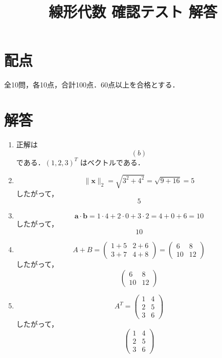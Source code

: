 \documentclass[uplatex,a4paper,12pt]{jsarticle}
\begin{document}
\title{線形代数 確認テスト 解答}
\author{}
\date{}
\maketitle

\section*{配点}
全10問，各10点，合計100点．60点以上を合格とする．

\section*{解答}

\begin{enumerate}

\item
正解は
\[
\boxed{(b)}
\]
である．$(1,2,3)^T$ はベクトルである．

\item
\[
\|\mathbf{x}\|_2
=
\sqrt{3^2+4^2}
=
\sqrt{9+16}
=
5
\]
したがって，
\[
\boxed{5}
\]

\item
\[
\mathbf{a}\cdot\mathbf{b}
=
1\cdot4+2\cdot0+3\cdot2
=
4+0+6
=
10
\]
したがって，
\[
\boxed{10}
\]

\item
\[
A+B=
\begin{pmatrix}
1+5 & 2+6\\
3+7 & 4+8
\end{pmatrix}
=
\begin{pmatrix}
6&8\\
10&12
\end{pmatrix}
\]
したがって，
\[
\boxed{
\begin{pmatrix}
6&8\\
10&12
\end{pmatrix}
}
\]

\item
\[
A^T=
\begin{pmatrix}
1&4\\
2&5\\
3&6
\end{pmatrix}
\]
したがって，
\[
\boxed{
\begin{pmatrix}
1&4\\
2&5\\
3&6
\end{pmatrix}
}
\]


\end{enumerate}
\end{document}
